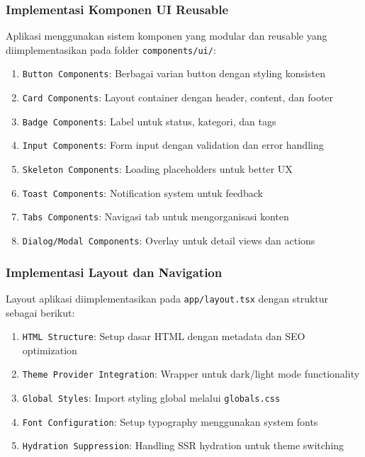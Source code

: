 \subsubsection{Implementasi Komponen UI Reusable}

Aplikasi menggunakan sistem komponen yang modular dan reusable yang diimplementasikan pada folder \texttt{components/ui/}:

\begin{enumerate}
	\item \texttt{Button Components}: Berbagai varian button dengan styling konsisten
	\item \texttt{Card Components}: Layout container dengan header, content, dan footer
	\item \texttt{Badge Components}: Label untuk status, kategori, dan tags
	\item \texttt{Input Components}: Form input dengan validation dan error handling
	\item \texttt{Skeleton Components}: Loading placeholders untuk better UX
	\item \texttt{Toast Components}: Notification system untuk feedback
	\item \texttt{Tabs Components}: Navigasi tab untuk mengorganisasi konten
	\item \texttt{Dialog/Modal Components}: Overlay untuk detail views dan actions
\end{enumerate}

\subsubsection{Implementasi Layout dan Navigation}

Layout aplikasi diimplementasikan pada \texttt{app/layout.tsx} dengan struktur sebagai berikut:

\begin{enumerate}
	\item \texttt{HTML Structure}: Setup dasar HTML dengan metadata dan SEO optimization
	\item \texttt{Theme Provider Integration}: Wrapper untuk dark/light mode functionality
	\item \texttt{Global Styles}: Import styling global melalui \texttt{globals.css}
	\item \texttt{Font Configuration}: Setup typography menggunakan system fonts
	\item \texttt{Hydration Suppression}: Handling SSR hydration untuk theme switching
\end{enumerate}

